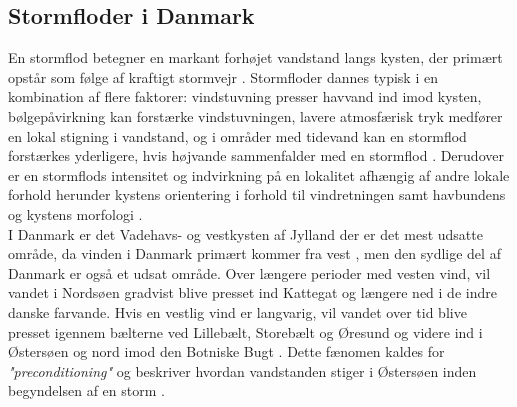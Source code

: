 
\subsection{Stormfloder i Danmark} \label{Afsnit: Stormfloder}

En stormflod betegner en markant forhøjet vandstand langs kysten, der primært opstår som følge af kraftigt stormvejr \citep{shoreline_management_guidelines}. Stormfloder dannes typisk i en kombination af flere faktorer: vindstuvning presser havvand ind imod kysten, bølgepåvirkning kan forstærke vindstuvningen, lavere atmosfærisk tryk medfører en lokal stigning i vandstand, og i områder med tidevand kan en stormflod forstærkes yderligere, hvis højvande sammenfalder med en stormflod \citep{piecuch_high-tide_2022}. Derudover er en stormflods intensitet og indvirkning på en lokalitet afhængig af andre lokale forhold herunder kystens orientering i forhold til vindretningen samt havbundens og kystens morfologi \citep{noaa_storm, shoreline_management_guidelines}.\\

I Danmark er det Vadehavs- og vestkysten af Jylland der er det mest udsatte område, da vinden i Danmark primært kommer fra vest \citep{cappelen_dmi_2020}, men den sydlige del af Danmark er også et udsat område. Over længere perioder med vesten vind, vil vandet i Nordsøen gradvist blive presset ind Kattegat og længere ned i de indre danske farvande. Hvis en vestlig vind er langvarig, vil vandet over tid blive presset igennem bælterne ved Lillebælt, Storebælt og Øresund og videre ind i Østersøen og nord imod den Botniske Bugt \citep{kiesel_brief_2024, egusphere_baltic}. Dette fænomen kaldes for \textit{"preconditioning"} og beskriver hvordan vandstanden stiger i Østersøen inden begyndelsen af en storm \citep{kiesel_brief_2024, weisse_sea_2021}. \\   

